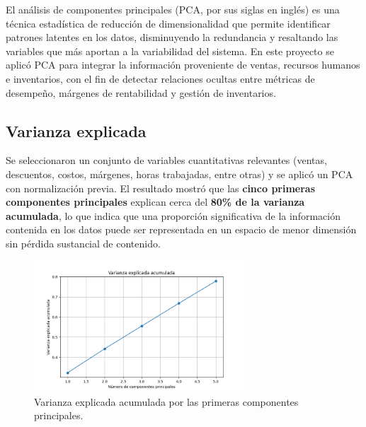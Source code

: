 \documentclass[12pt,a4paper]{article}
\begin{document}
El análisis de componentes principales (PCA, por sus siglas en inglés) es una técnica 
estadística de reducción de dimensionalidad que permite identificar patrones latentes 
en los datos, disminuyendo la redundancia y resaltando las variables que más aportan 
a la variabilidad del sistema. En este proyecto se aplicó PCA para integrar la 
información proveniente de ventas, recursos humanos e inventarios, con el fin de 
detectar relaciones ocultas entre métricas de desempeño, márgenes de rentabilidad y 
gestión de inventarios.

\subsection{Varianza explicada}
Se seleccionaron un conjunto de variables cuantitativas relevantes (ventas, descuentos, 
costos, márgenes, horas trabajadas, entre otras) y se aplicó un PCA con normalización 
previa. El resultado mostró que las \textbf{cinco primeras componentes principales} 
explican cerca del \textbf{80\% de la varianza acumulada}, lo que indica que una 
proporción significativa de la información contenida en los datos puede ser representada 
en un espacio de menor dimensión sin pérdida sustancial de contenido.

\begin{figure}[H]
    \centering
    \includegraphics[width=0.7\textwidth]{figures/pca_variance.png}
    \caption{Varianza explicada acumulada por las primeras componentes principales.}
    \label{fig:pca_variance}
\end{figure}
\end{document}
